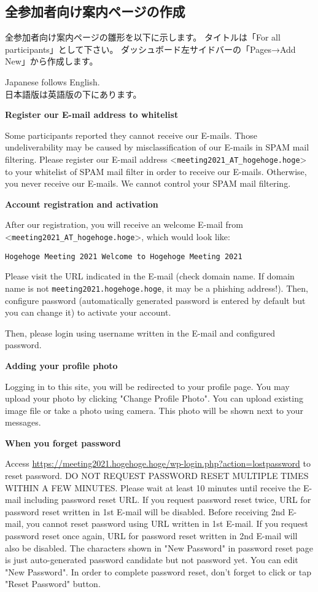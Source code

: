 \documentclass[titlepage,10pt,a4paper,uplatex]{jsbook}
\newenvironment{content}{\begin{shaded}\vspace{-1em}\raggedright\ttfamily\footnotesize\setlength{\baselineskip}{1.4em}}{\end{shaded}\vspace{-1em}}
\renewcommand{\textbf}[1]{{\bfseries\sffamily#1}}
\begin{document}
\subsection{全参加者向け案内ページの作成}

全参加者向け案内ページの雛形を以下に示します。
タイトルは「For all participants」として下さい。
ダッシュボード左サイドバーの「Pages→Add New」から作成します。

\begin{content}
Japanese follows English.\\
日本語版は英語版の下にあります。

\textbf{\Large Register our E-mail address to whitelist}

Some participants reported they cannot receive our E-mails. Those undeliverability may be caused by misclassification of our E-mails in SPAM mail filtering. Please register our E-mail address {\textless}\texttt{meeting2021\_AT\_hogehoge.hoge}{\textgreater} to your whitelist of SPAM mail filter in order to receive our E-mails. Otherwise, you never receive our E-mails. We cannot control your SPAM mail filtering.

\textbf{\Large Account registration and activation}

After our registration, you will receive an welcome E-mail from {\textless}\texttt{meeting2021\_AT\_hogehoge.hoge}{\textgreater}, which would look like:

\texttt{{\lbrack}Hogehoge Meeting 2021{\rbrack} Welcome to Hogehoge Meeting 2021}

Please visit the URL indicated in the E-mail (check domain name. If domain name is not \texttt{meeting2021.hogehoge.hoge}, it may be a phishing address!). Then, configure password (automatically generated password is entered by default but you can change it) to activate your account.

Then, please login using username written in the E-mail and configured password.

\textbf{\Large Adding your profile photo}

Logging in to this site, you will be redirected to your profile page. You may upload your photo by clicking "Change Profile Photo". You can upload existing image file or take a photo using camera. This photo will be shown next to your messages.

\textbf{\Large When you forget password}

Access \url{https://meeting2021.hogehoge.hoge/wp-login.php?action=lostpassword} to reset password. DO NOT REQUEST PASSWORD RESET MULTIPLE TIMES WITHIN A FEW MINUTES. Please wait at least 10 minutes until receive the E-mail including password reset URL. If you request password reset twice, URL for password reset written in 1st E-mail will be disabled. Before receiving 2nd E-mail, you cannot reset password using URL written in 1st E-mail. If you request password reset once again, URL for password reset written in 2nd E-mail will also be disabled. The characters shown in "New Password" in password reset page is just auto-generated password candidate but not password yet. You can edit "New Password". In order to complete password reset, don't forget to click or tap "Reset Password" button.


\end{content}
\end{document}
